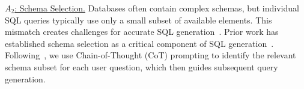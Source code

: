 \uline{$A_2$: Schema Selection.}
Databases often contain complex schemas, but individual SQL queries typically use only a small subset of available elements. This mismatch creates challenges for accurate SQL generation~\cite{nl2sql-survey}.
Prior work has established schema selection as a critical component of SQL generation~\cite{rslsql, CHASE, chesssql}. Following~\cite{chesssql}, we use Chain-of-Thought (CoT) prompting to identify the relevant schema subset for each user question, which then guides subsequent query generation.

